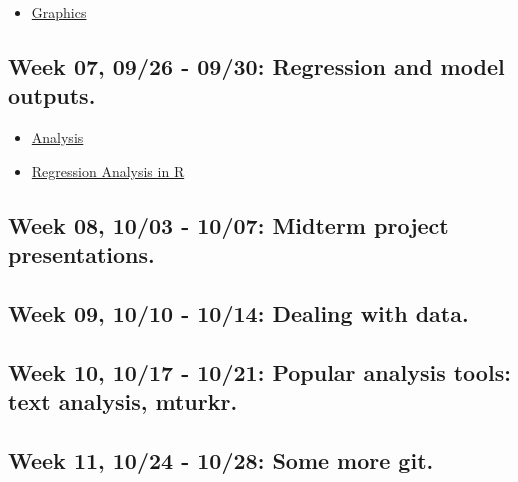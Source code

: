 \documentclass[11pt,]{article}
\providecommand{\tightlist}{%
  \setlength{\itemsep}{0pt}\setlength{\parskip}{0pt}}
\begin{document}
\begin{itemize}
\tightlist
\item
  \href{https://mikedecr.github.io/courses/811/811-04-graphics/}{Graphics}
\end{itemize}

\hypertarget{week-07-0926---0930-regression-and-model-outputs.}{%
\subsection{Week 07, 09/26 - 09/30: Regression and model
outputs.}\label{week-07-0926---0930-regression-and-model-outputs.}}

\begin{itemize}
\tightlist
\item
  \href{https://mikedecr.github.io/courses/811/811-05-analysis/}{Analysis}
\item
  \href{https://raw.githack.com/uo-ec607/lectures/master/08-regression/08-regression.html}{Regression
  Analysis in R}
\end{itemize}

\hypertarget{week-08-1003---1007-midterm-project-presentations.}{%
\subsection{Week 08, 10/03 - 10/07: Midterm project
presentations.}\label{week-08-1003---1007-midterm-project-presentations.}}

\hypertarget{week-09-1010---1014-dealing-with-data.}{%
\subsection{Week 09, 10/10 - 10/14: Dealing with
data.}\label{week-09-1010---1014-dealing-with-data.}}

\hypertarget{week-10-1017---1021-popular-analysis-tools-text-analysis-mturkr.}{%
\subsection{Week 10, 10/17 - 10/21: Popular analysis tools: text
analysis,
mturkr.}\label{week-10-1017---1021-popular-analysis-tools-text-analysis-mturkr.}}

\hypertarget{week-11-1024---1028-some-more-git.}{%
\subsection{Week 11, 10/24 - 10/28: Some more
git.}\label{week-11-1024---1028-some-more-git.}}
\end{document}
